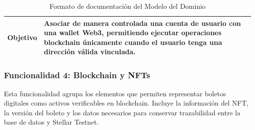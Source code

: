 \documentclass[12pt,letterpaper]{article}
\begin{document}
\begin{table}[H]
\begin{tabularx}{\textwidth}{|p{3.2cm}|X|p{3.8cm}|}
\textbf{Objetivo} & 
\multicolumn{2}{X|}{Asociar de manera controlada una cuenta de usuario con una wallet Web3, permitiendo ejecutar operaciones blockchain únicamente cuando el usuario tenga una dirección válida vinculada.} \\ \hline

\end{tabularx}

\caption{Formato de documentación del Modelo del Dominio}
\label{tab:modelo_dominio_usuario_web3_wallet}
\normalsize
\end{table}

\subsubsection{Funcionalidad 4: Blockchain y NFTs}
Esta funcionalidad agrupa los elementos que permiten representar boletos digitales como activos verificables en blockchain. Incluye la información del NFT, la versión del boleto y los datos necesarios para conservar trazabilidad entre la base de datos y Stellar Testnet.
\end{document}
